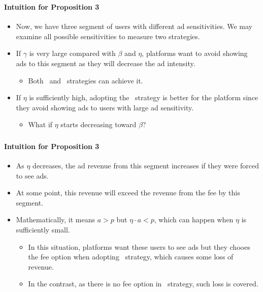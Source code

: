 \documentclass{beamer}
\newcommand{\hl}[1]{\textcolor{myblue}{#1}}
\newcommand{\al}{\textch{\textcolor{myblue}{Allow}}}
\newcommand{\aof}{\textch{\textcolor{myblue}{Ads or Fee}}}
\begin{document}
\begin{frame}%
    \frametitle{\aof}
    \framesubtitle{Intuition for Proposition 3}
    \begin{itemize}
        \item Now, we have three segment of users with different ad sensitivities.
            We may examine all possible sensitivities to measure two strategies.
        \item If $\gamma$ is very large compared with $\beta$ and $\eta$, platforms
            want to avoid showing ads to this segment as they will decrease the 
            ad intensity.
            \begin{itemize}
                \item Both \aof\ and \al\ strategies can achieve it.
            \end{itemize}
        \item If $\eta$ is sufficiently high, adopting the \aof\
            strategy is better for the platform since they avoid showing ads to 
            users with large ad sensitivity.
            \begin{itemize}
                \item \hl{What if $\eta$ starts decreasing toward $\beta$?}
            \end{itemize}
    \end{itemize}
\end{frame}

\begin{frame}%
    \frametitle{\aof}
    \framesubtitle{Intuition for Proposition 3}
    \begin{itemize}
        \item \hl{As $\eta$ decreases}, the ad revenue from this segment \hl{increases}
            if they were forced to see ads.
        \item At some point, this revenue will exceed the revenue from the fee by
            this segment.
        \item Mathematically, it means $a>p$ but $\eta\cdot a<p$, which can happen
            when $\eta$ is sufficiently small.
            \begin{itemize}
                \item In this situation, platforms want these users to see ads but
                    they chooes the fee option when adopting \aof\ strategy, which
                    causes some loss of revenue.
                \item In the contrast, as there is no fee option in \al\ strategy,
                    such loss is covered.
            \end{itemize}
    \end{itemize}
\end{frame}
\end{document}
